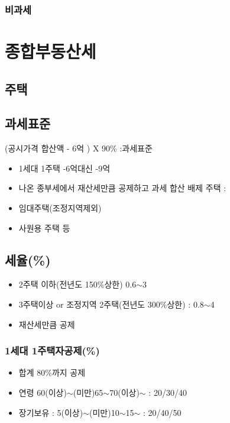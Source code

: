 \documentclass{oblivoir}
\begin{document}
\begin{multicols}{2}
\subsubsection{비과세}\label{uxbe44uxacfcuxc138-2}

\section{종합부동산세}\label{uxc885uxd569uxbd80uxb3d9uxc0b0uxc138}

\subsection{주택}\label{uxc8fcuxd0dd}

\subsection{과세표준}\label{uxacfcuxc138uxd45cuxc900-1}

(공시가격 합산액 - 6억 ) X 90\% :과세표준

\begin{itemize}
\itemsep1pt\parskip0pt
\item
  1세대 1주택 -6억대신 -9억
\item
  나온 종부세에서 재산세만큼 공제하고 과세 합산 배제 주택 :
\item
  임대주택(조정지역제외)
\item
  사원용 주택 등
\end{itemize}

\subsection{세율(\%)}\label{uxc138uxc728-2}

\begin{itemize}
\itemsep1pt\parskip0pt
\item
  2주택 이하(전년도 150\%상한) 0.6$\sim$3
\item
  3주택이상 or 조정지역 2주택(전년도 300\%상한) : 0.8$\sim$4
\item
  재산세만큼 공제
\end{itemize}

\subsubsection{1세대 1주택자공제(\%)}\label{uxc138uxb300-1uxc8fcuxd0dduxc790-uxacf5uxc81c}

\begin{itemize}
\itemsep1pt\parskip0pt
\item
  합계 80\%까지 공제
\item
  연령 60(이상)$\sim$(미만)65$\sim$70(이상)$\sim$ :
  20/30/40
\item
  장기보유 : 5(이상)$\sim$(미만)10$\sim$15$\sim$ :
  20/40/50
\end{itemize}


\end{multicols}
\end{document}
